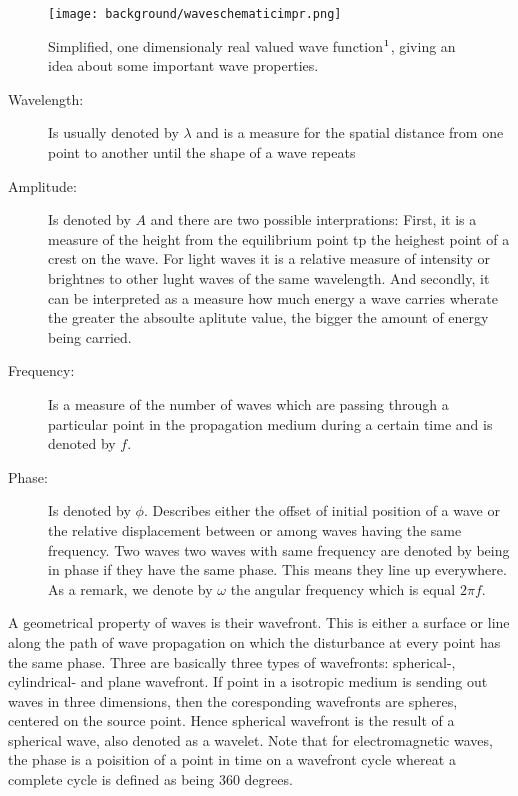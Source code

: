 \begin{figure}[H]
  \centering
  \texttt{[image: background/waveschematicimpr.png]}
  \caption[sinewave]{Simplified, one dimensionaly real valued wave function$\footnotemark$, giving an idea about some important wave properties.}
  \label{fig:wavebasics}
\end{figure}

\begin{description}
  \item[Wavelength:] Is usually denoted by $\lambda$ and is a measure for the spatial distance from one point to another until the shape of a wave repeats
  \item[Amplitude:] Is denoted by $A$ and there are two possible interprations: First, it is a measure of the height from the equilibrium point tp the heighest point of a crest on the wave. For light waves it is a relative measure of intensity or brightnes to other lught waves of the same wavelength. And secondly, it can be interpreted as a measure how much energy a wave carries wherate the greater the absoulte aplitute value, the bigger the amount of energy being carried.
  \item[Frequency:] Is a measure of the number of waves which are passing through a particular point in the propagation medium during a certain time and is denoted by $f$.
  \item[Phase:] Is denoted by $\phi$. Describes either the offset of initial position of a wave or the relative displacement between or among waves having the same frequency. Two waves two waves with same frequency are denoted by being in phase if they have the same phase. This means they line up everywhere. As a remark, we denote by $\omega$ the angular frequency which is equal $2\pi f$. 
\end{description}

A geometrical property of waves is their wavefront. This is either a surface or line along the path of wave propagation on which the disturbance at every point has the same phase. Three are basically three types of wavefronts: spherical-, cylindrical- and plane wavefront. If point in a isotropic medium is sending out waves in three dimensions, then the coresponding wavefronts are spheres, centered on the source point. Hence spherical wavefront is the result of a spherical wave, also denoted as a wavelet. Note that for electromagnetic waves, the phase is a poisition of a point in time on a wavefront cycle whereat a complete cycle is defined as being 360 degrees.


